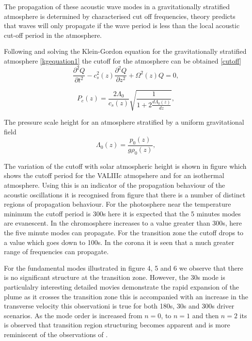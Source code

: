 \documentclass[final,1p]{elsarticle}
\begin{document}
The propagation of these acoustic wave modes in a gravitationally stratified atmosphere is determined by characterised cut off frequencies, theory predicts that waves will only propagate if the wave period is less than the local acoustic cut-off period in the atmosphere.

Following \cite{Taroyan2008} and solving the Klein-Gordon equation for the gravitationally stratified atmosphere \eqref{kgequation1} the cutoff for the atmosphere can be obtained \eqref{cutoff}
\begin{equation}\label{kgequation1}
\frac{\partial^2 Q}{\partial t^2} - c_s^2(z) \frac{\partial^2 Q}{\partial z^2} + \Omega^2(z)Q = 0 ,
\end{equation}

\begin{equation}\label{cutoff}
P_{c}(z)=\frac{   2\Lambda_0   }{ c_{s}(z)}   \sqrt{\frac{1}{1+2\frac{d\Lambda_0(z)}{dz}}} ,
\end{equation}

The pressure scale height for an atmosphere stratified by a uniform gravitational field
\begin{equation}\label{lambda0}
\Lambda_0(z)=\frac{p_0(z)}{g\rho_0(z)} ,
\end{equation}

The variation of the cutoff with solar atmospheric height is shown in figure 
 which shows the cutoff period for the VALIIIc atmopshere and for an isothermal atmosphere. Using this is an indicator of the propagation behaviour of the acoustic oscillations it is recognised from figure 
 that there is a number of distinct regions of propagation behaviour. For the photosphere near the temperature minimum  the cutoff period is 300s here it is expected that the 5 minutes modes are evanescent. In the chromosphere increases to a value greater than 300s, here the five minute modes can propagate. For the transition zone the cutoff drops to a value which goes down to 100s. In the corona it is seen that a much greater range of frequencies can propagate.

For the fundamental modes  illustrated in figure 4, 5 and 6 we observe that there is no significant structure at the transition zone. However, the 30s mode is particulalry interesting detailed movies demonstrate the rapid expansion of the plume as it crosses the transition zone this is accompanied with an increase in the transverse velocity this observationi is true for both 180s, 30s and 300s driver scenarios. As the mode order is increased from $n=0$, to $n=1$ and then $n=2$ its is observed that transition region structuring becomes apparent and is more reminiscent of the observations of \cite{Malins2007B}.
\end{document}
